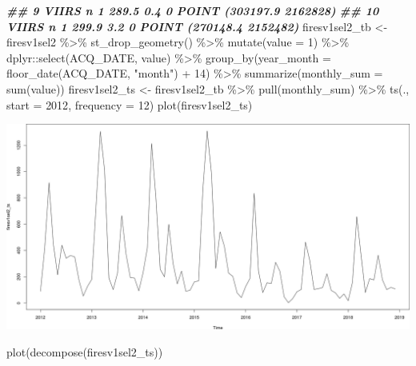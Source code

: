 \documentclass[10pt,landscape,a3paper]{article}
\newenvironment{Shaded}{\begin{snugshade}}{\end{snugshade}}
\newcommand{\AttributeTok}[1]{\textcolor[rgb]{0.77,0.63,0.00}{#1}}
\newcommand{\DecValTok}[1]{\textcolor[rgb]{0.00,0.00,0.81}{#1}}
\newcommand{\DocumentationTok}[1]{\textcolor[rgb]{0.56,0.35,0.01}{\textbf{\textit{#1}}}}
\newcommand{\FunctionTok}[1]{\textcolor[rgb]{0.00,0.00,0.00}{#1}}
\newcommand{\NormalTok}[1]{#1}
\newcommand{\OtherTok}[1]{\textcolor[rgb]{0.56,0.35,0.01}{#1}}
\newcommand{\SpecialCharTok}[1]{\textcolor[rgb]{0.00,0.00,0.00}{#1}}
\newcommand{\StringTok}[1]{\textcolor[rgb]{0.31,0.60,0.02}{#1}}
\begin{document}
\begin{Shaded}
\begin{Highlighting}[]
\DocumentationTok{\#\# 9       VIIRS          n       1      289.5  0.4    0 POINT (303197.9 2162828)}
\DocumentationTok{\#\# 10      VIIRS          n       1      299.9  3.2    0 POINT (270148.4 2152482)}
\NormalTok{firesv1sel2\_tb }\OtherTok{\textless{}{-}}\NormalTok{ firesv1sel2 }\SpecialCharTok{\%\textgreater{}\%} 
  \FunctionTok{st\_drop\_geometry}\NormalTok{() }\SpecialCharTok{\%\textgreater{}\%} 
  \FunctionTok{mutate}\NormalTok{(}\AttributeTok{value =} \DecValTok{1}\NormalTok{) }\SpecialCharTok{\%\textgreater{}\%} 
\NormalTok{  dplyr}\SpecialCharTok{::}\FunctionTok{select}\NormalTok{(ACQ\_DATE, value) }\SpecialCharTok{\%\textgreater{}\%} 
  \FunctionTok{group\_by}\NormalTok{(}\AttributeTok{year\_month =} \FunctionTok{floor\_date}\NormalTok{(ACQ\_DATE, }\StringTok{"month"}\NormalTok{) }\SpecialCharTok{+} \DecValTok{14}\NormalTok{) }\SpecialCharTok{\%\textgreater{}\%}
  \FunctionTok{summarize}\NormalTok{(}\AttributeTok{monthly\_sum =} \FunctionTok{sum}\NormalTok{(value))}
\NormalTok{firesv1sel2\_ts }\OtherTok{\textless{}{-}}\NormalTok{ firesv1sel2\_tb }\SpecialCharTok{\%\textgreater{}\%} 
  \FunctionTok{pull}\NormalTok{(monthly\_sum) }\SpecialCharTok{\%\textgreater{}\%} 
  \FunctionTok{ts}\NormalTok{(., }\AttributeTok{start =} \DecValTok{2012}\NormalTok{, }\AttributeTok{frequency =} \DecValTok{12}\NormalTok{)}
\FunctionTok{plot}\NormalTok{(firesv1sel2\_ts)}
\end{Highlighting}
\end{Shaded}

\begin{center}\includegraphics[width=0.75\linewidth]{img/data-download-preparation-eda/unnamed-chunk-1-3} \end{center}

\begin{Shaded}
\begin{Highlighting}[]
\FunctionTok{plot}\NormalTok{(}\FunctionTok{decompose}\NormalTok{(firesv1sel2\_ts))}
\end{Highlighting}
\end{Shaded}
\end{document}
